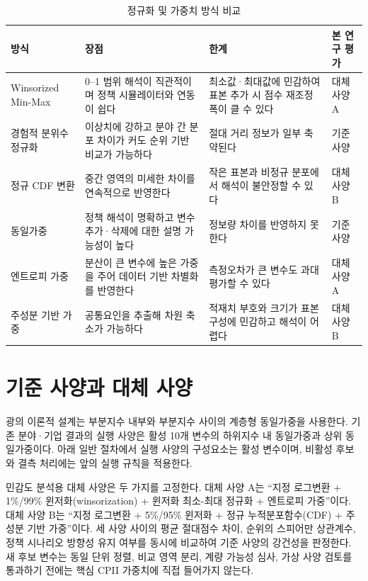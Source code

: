 \documentclass[11pt,a4paper]{report}
\begin{document}
\begin{table}[H]
  \centering
  \small
  \caption{정규화 및 가중치 방식 비교}\label{tab:cpii_normalization_weight_compare}
  \begin{tabular}{L{2.7cm}L{4.1cm}L{3.9cm}L{2.8cm}}
    \toprule
    방식 & 장점 & 한계 & 본 연구 평가 \\
    \midrule
    Winsorized Min-Max & 0--1 범위 해석이 직관적이며 정책 시뮬레이터와 연동이 쉽다 & 최소값·최대값에 민감하여 표본 추가 시 점수 재조정 폭이 클 수 있다 & 대체 사양 A \\
    경험적 분위수 정규화 & 이상치에 강하고 분야 간 분포 차이가 커도 순위 기반 비교가 가능하다 & 절대 거리 정보가 일부 축약된다 & 기준 사양 \\
    정규 CDF 변환 & 중간 영역의 미세한 차이를 연속적으로 반영한다 & 작은 표본과 비정규 분포에서 해석이 불안정할 수 있다 & 대체 사양 B \\
    동일가중 & 정책 해석이 명확하고 변수 추가·삭제에 대한 설명 가능성이 높다 & 정보량 차이를 반영하지 못한다 & 기준 사양 \\
    엔트로피 가중 & 분산이 큰 변수에 높은 가중을 주어 데이터 기반 차별화를 반영한다 & 측정오차가 큰 변수도 과대평가할 수 있다 & 대체 사양 A \\
    주성분 기반 가중 & 공통요인을 추출해 차원 축소가 가능하다 & 적재치 부호와 크기가 표본 구성에 민감하고 해석이 어렵다 & 대체 사양 B \\
    \bottomrule
  \end{tabular}
\end{table}

\section{기준 사양과 대체 사양}
광의 이론적 설계는 부분지수 내부와 부분지수 사이의 계층형 동일가중을 사용한다. 기존 분야·기업 결과의 실행 사양은 활성 10개 변수의 하위지수 내 동일가중과 상위 동일가중이다. 아래 일반 절차에서 실행 사양의 구성요소는 활성 변수이며, 비활성 후보와 결측 처리에는 앞의 실행 규칙을 적용한다.

민감도 분석용 대체 사양은 두 가지를 고정한다. 대체 사양 A는 ``지정 로그변환 + 1\%/99\% 윈저화(winsorization) + 윈저화 최소-최대 정규화 + 엔트로피 가중''이다. 대체 사양 B는 ``지정 로그변환 + 5\%/95\% 윈저화 + 정규 누적분포함수(CDF) + 주성분 기반 가중''이다. 세 사양 사이의 평균 절대점수 차이, 순위의 스피어만 상관계수, 정책 시나리오 방향성 유지 여부를 동시에 비교하여 기준 사양의 강건성을 판정한다. 새 후보 변수는 동일 단위 정렬, 비교 영역 분리, 계량 가능성 심사, 가상 사양 검토를 통과하기 전에는 핵심 CPII 가중치에 직접 들어가지 않는다.
\end{document}
